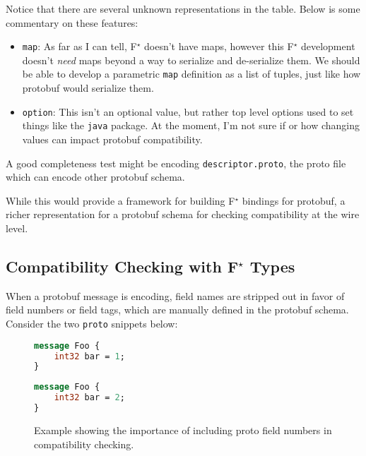 \documentclass[11pt]{article}
\newcommand{\fstar}{F\(^\star\)}
\begin{document}
Notice that there are several unknown representations in the table. Below is
some commentary on these features:

\begin{itemize}
	\item \texttt{map}: As far as I can tell, \fstar{} doesn't have maps, however
	      this \fstar{} development doesn't \emph{need} maps beyond a way to serialize
	      and de-serialize them. We should be able to develop a parametric
	      \texttt{map} definition as a list of tuples, just like how protobuf would
	      serialize them.
	\item \texttt{option}: This isn't an optional value, but rather top level
	      options used to set things like the \texttt{java} package. At the moment,
	      I'm not sure if or how changing values can impact protobuf compatibility.
\end{itemize}

A good completeness test might be encoding \texttt{descriptor.proto}, the proto
file which can encode other protobuf schema.

While this would provide a framework for building \fstar{} bindings for
protobuf, a richer representation for a protobuf schema for checking
compatibility at the wire level.

\subsection{Compatibility Checking with \fstar{} Types}

When a protobuf message is encoding, field names are stripped out in favor of
field numbers or field tags, which are manually defined in the protobuf
schema. Consider the two \texttt{proto} snippets below:

\begin{figure}[H]
	\centering
	\begin{minipage}[bt]{0.4\textwidth}
		\begin{lstlisting}[language=proto]
message Foo {
    int32 bar = 1;
}\end{lstlisting}
	\end{minipage}
	\hspace{1cm}
	\begin{minipage}[bt]{0.4\textwidth}
		\begin{lstlisting}[language=proto]
message Foo {
    int32 bar = 2;
}\end{lstlisting}
	\end{minipage}

	\caption[]{Example showing the importance of including proto field numbers in
		compatibility checking.}
\end{figure}
\end{document}
